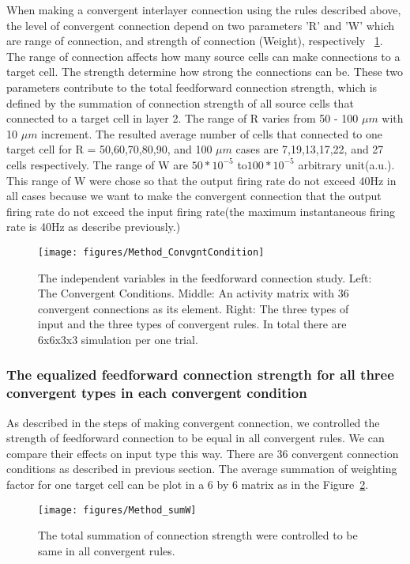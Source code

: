 When making a convergent interlayer connection using the rules described above, the level of convergent connection  depend on two parameters 'R' and 'W' which are range of connection, and strength of connection (Weight),  respectively ~\ref{fig:ConvergentConn}. The range of connection affects how many source cells can make connections to a target cell. The strength determine how strong the connections can be.  These two parameters contribute to the total feedforward connection strength, which is defined by the summation of connection strength of all source cells that connected to a target cell in layer 2. The range of R varies from 50 - 100 $\mu m$ with 10 $\mu m$ increment. The resulted average number of cells that connected to one target cell for R = 50,60,70,80,90, and  100 $\mu m$ cases are 7,19,13,17,22, and 27 cells respectively. The range of W are $50*10^{-5} $ to$ 100*10^{-5}$  arbitrary unit(a.u.).   This range of W were chose so that the output firing rate do not exceed 40Hz in all cases because we want to make the convergent connection that the output firing rate do not exceed the input firing rate(the maximum instantaneous firing rate is 40Hz as describe previously.) 
\begin{figure}[!h]
	\centering
	\texttt{[image: figures/Method\_ConvgntCondition]}
	\caption{The independent variables in the feedforward connection study. Left: The Convergent Conditions. Middle: An activity matrix with 36 convergent connections as its element. Right: The three types of input and the three types of convergent rules. In total there are 6x6x3x3 simulation per one trial.}
	\label{fig:ConvergentConn}
\end{figure} 



\subsubsection{The equalized feedforward connection strength for all three convergent types in each convergent condition}
As described in the steps of making convergent connection, we controlled the strength of feedforward connection to be equal in all convergent rules. We can compare their effects on input type this way.  There are 36 convergent connection conditions as described in previous section. The average summation of weighting factor for one target cell can be plot in a 6 by 6 matrix as in the Figure~\ref{fig:ConSumW}.
\begin{figure}
	\centering
	\texttt{[image: figures/Method\_sumW]}
	\caption{The total summation of connection strength were controlled to be same in all convergent rules.}
	\label{fig:ConSumW}
\end{figure}

